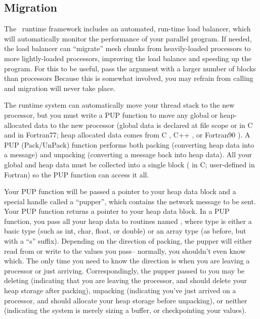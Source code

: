 \documentclass[10pt]{article}
\begin{document}
\subsection{Migration}

The \charmpp\ runtime framework includes an automated, run-time load balancer,
which will automatically monitor the performance of your parallel program.
If needed, the load balancer can ``migrate'' mesh chunks from heavily-loaded
processors to more lightly-loaded processors, improving the load balance and
speeding up the program.  For this to be useful, pass the  argument
with a larger number of blocks  than processors
Because this is somewhat involved, you may refrain from calling 
 and migration will never take place.

The runtime system can automatically move your thread stack to the new
processor, but you must write a PUP function to move any global or
heap-allocated data to the new processor (global data is declared at file scope
or  in C and  in Fortran77; heap allocated data comes
from C , C++ , or Fortran90 ).  A PUP
(Pack/UnPack) function performs both packing (converting heap data into a
message) and unpacking (converting a message back into heap data).  All your
global and heap data must be collected into a single block ( in C;
user-defined  in Fortran) so the PUP function can access it all.

Your PUP function will be passed a pointer to your heap data block and a
special handle called a ``pupper'', which contains the network message to be
sent.  Your PUP function returns a pointer to your heap data block.  In a PUP
function, you pass all your heap data to routines named , where
type is either a basic type (such as int, char, float, or double) or an array
type (as before, but with a ``s'' suffix).  Depending on the direction of
packing, the pupper will either read from or write to the values you pass--
normally, you shouldn't even know which.  The only time you need to know the
direction is when you are leaving a processor or just arriving.
Correspondingly, the pupper passed to you may be deleting (indicating that you
are leaving the processor, and should delete your heap storage after packing),
unpacking (indicating you've just arrived on a processor, and should allocate
your heap storage before unpacking), or neither (indicating the system is
merely sizing a buffer, or checkpointing your values).
\end{document}
